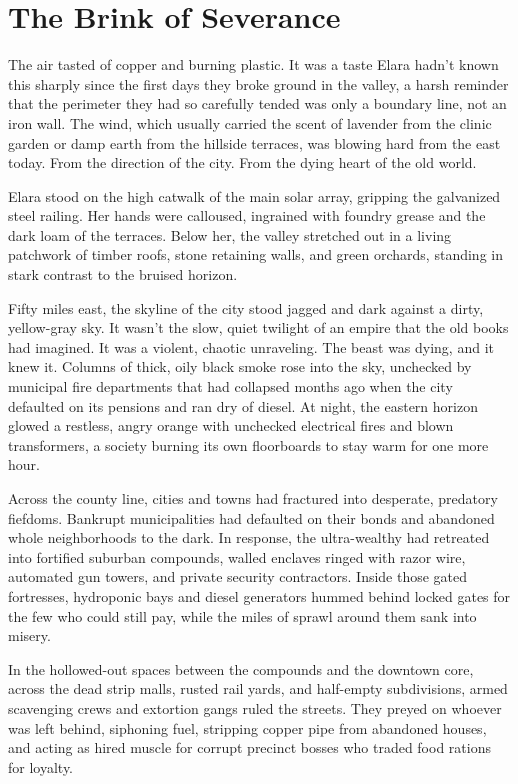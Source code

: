 \chapter{The Brink of Severance}


The air tasted of copper and burning plastic. It was a taste Elara hadn't known this sharply since the first days they broke ground in the valley, a harsh reminder that the perimeter they had so carefully tended was only a boundary line, not an iron wall. The wind, which usually carried the scent of lavender from the clinic garden or damp earth from the hillside terraces, was blowing hard from the east today. From the direction of the city. From the dying heart of the old world.

Elara stood on the high catwalk of the main solar array, gripping the galvanized steel railing. Her hands were calloused, ingrained with foundry grease and the dark loam of the terraces. Below her, the valley stretched out in a living patchwork of timber roofs, stone retaining walls, and green orchards, standing in stark contrast to the bruised horizon. 

Fifty miles east, the skyline of the city stood jagged and dark against a dirty, yellow-gray sky. It wasn't the slow, quiet twilight of an empire that the old books had imagined. It was a violent, chaotic unraveling. The beast was dying, and it knew it. Columns of thick, oily black smoke rose into the sky, unchecked by municipal fire departments that had collapsed months ago when the city defaulted on its pensions and ran dry of diesel. At night, the eastern horizon glowed a restless, angry orange with unchecked electrical fires and blown transformers, a society burning its own floorboards to stay warm for one more hour.

Across the county line, cities and towns had fractured into desperate, predatory fiefdoms. Bankrupt municipalities had defaulted on their bonds and abandoned whole neighborhoods to the dark. In response, the ultra-wealthy had retreated into fortified suburban compounds, walled enclaves ringed with razor wire, automated gun towers, and private security contractors. Inside those gated fortresses, hydroponic bays and diesel generators hummed behind locked gates for the few who could still pay, while the miles of sprawl around them sank into misery.

In the hollowed-out spaces between the compounds and the downtown core, across the dead strip malls, rusted rail yards, and half-empty subdivisions, armed scavenging crews and extortion gangs ruled the streets. They preyed on whoever was left behind, siphoning fuel, stripping copper pipe from abandoned houses, and acting as hired muscle for corrupt precinct bosses who traded food rations for loyalty.


